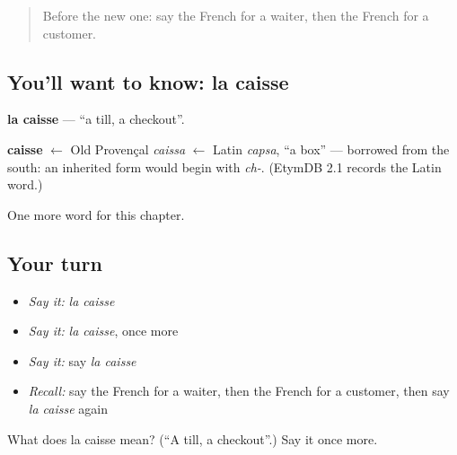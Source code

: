 \label{lesson:FR-C125-caisse}



\begin{quote}
Before the new one: say the French for a waiter, then the French for a customer.
\end{quote}

\subsection*{You'll want to know: la caisse}
\textbf{la caisse} — \textquotedblleft{}a till, a checkout\textquotedblright{}.

\begin{cousinweb}
\textbf{caisse} $\leftarrow$ Old Provençal \emph{caissa} $\leftarrow$ Latin \emph{capsa}, \textquotedblleft{}a box\textquotedblright{} — borrowed from the south: an inherited form would begin with \emph{ch-}. (EtymDB 2.1 records the Latin word.)
\end{cousinweb}

\begin{grammarlens}[title={What you've built}]
One more word for this chapter.
\end{grammarlens}

\subsection*{Your turn}
\begin{itemize}
\raggedright
  \item \emph{Say it:} \emph{la caisse}
  \item \emph{Say it:} \emph{la caisse}, once more
  \item \emph{Say it:} say \emph{la caisse}
  \item \emph{Recall:} say the French for a waiter, then the French for a customer, then say \emph{la caisse} again
\end{itemize}

\begin{tcolorbox}[breakable,colback=teal!4,colframe=teal!35!black,title={Before you move on}]
What does la caisse mean? (\textquotedblleft{}A till, a checkout\textquotedblright{}.) Say it once more.
\end{tcolorbox}
